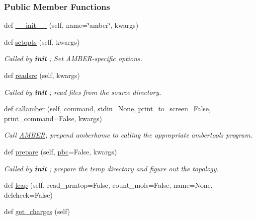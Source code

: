 \subsubsection*{Public Member Functions}
\begin{DoxyCompactItemize}
\item 
def \hyperlink{classsrc_1_1amberio_1_1AMBER_a4f65d618112f743df7dcba8fe71d9945}{\+\_\+\+\_\+init\+\_\+\+\_\+} (self, name=\char`\"{}amber\char`\"{}, kwargs)
\item 
def \hyperlink{classsrc_1_1amberio_1_1AMBER_a8fc5f8ce6499e190eda5cc527d844b47}{setopts} (self, kwargs)
\begin{DoxyCompactList}\small\item\em Called by {\bfseries init} ; Set A\+M\+B\+E\+R-\/specific options. \end{DoxyCompactList}\item 
def \hyperlink{classsrc_1_1amberio_1_1AMBER_a8b829208dde4cb5d071db96f2ea420ac}{readsrc} (self, kwargs)
\begin{DoxyCompactList}\small\item\em Called by {\bfseries init} ; read files from the source directory. \end{DoxyCompactList}\item 
def \hyperlink{classsrc_1_1amberio_1_1AMBER_a4fa14e4e3ccc8936084020563bf86e53}{callamber} (self, command, stdin=None, print\+\_\+to\+\_\+screen=False, print\+\_\+command=False, kwargs)
\begin{DoxyCompactList}\small\item\em Call \hyperlink{classsrc_1_1amberio_1_1AMBER}{A\+M\+B\+ER}; prepend amberhome to calling the appropriate ambertools program. \end{DoxyCompactList}\item 
def \hyperlink{classsrc_1_1amberio_1_1AMBER_a305ddd7d694a342b08e337aa3ab35a5f}{prepare} (self, \hyperlink{classsrc_1_1amberio_1_1AMBER_a7ec48c73aad9abedc968cdd627fde680}{pbc}=False, kwargs)
\begin{DoxyCompactList}\small\item\em Called by {\bfseries init} ; prepare the temp directory and figure out the topology. \end{DoxyCompactList}\item 
def \hyperlink{classsrc_1_1amberio_1_1AMBER_a8cb2d1848fd4fa90dd2998e38592a21e}{leap} (self, read\+\_\+prmtop=False, count\+\_\+mols=False, name=None, delcheck=False)
\item 
def \hyperlink{classsrc_1_1amberio_1_1AMBER_a07b9d708ccb41ff3253f253a38aa0d8f}{get\+\_\+charges} (self)

\end{DoxyCompactItemize}
